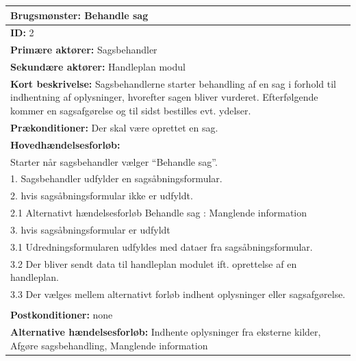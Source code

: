 \begin{center} \label{tab:2}
\begin{longtable}{|p{18cm}|}
\hline
\textbf{Brugsmønster:} Behandle sag \\
\hline
\textbf{ID:} 2\\
\hline
\textbf{Primære aktører:} Sagsbehandler\\
\hline
\textbf{Sekundære aktører:} Handleplan modul\\
\hline
\textbf{Kort beskrivelse:}  Sagsbehandlerne starter behandling af en sag i forhold til indhentning af oplysninger, hvorefter sagen bliver vurderet. Efterfølgende kommer en sagsafgørelse og til sidst bestilles evt. ydelser. \\
\hline
\textbf{Prækonditioner:} Der skal være oprettet en sag. \\
\hline
\textbf{Hovedhændelsesforløb:}\\
Starter når sagsbehandler vælger “Behandle sag”.\\
1. Sagsbehandler udfylder en sagsåbningsformular.\\
2. hvis sagsåbningsformular ikke er udfyldt.\\
2.1 Alternativt hændelsesforløb Behandle sag : Manglende information\\
3. hvis sagsåbningsformular er udfyldt\\
3.1 Udredningsformularen udfyldes med dataer fra  sagsåbningsformular.\\
3.2 Der bliver sendt data til handleplan modulet ift. oprettelse af en handleplan. \\
3.3 Der vælges mellem alternativt forløb indhent oplysninger eller sagsafgørelse.\\
\\
\hline
\textbf{Postkonditioner: }none\\
\hline
\textbf{Alternative hændelsesforløb: }Indhente oplysninger fra eksterne kilder, Afgøre sagsbehandling, Manglende information\\
\hline
\end{longtable}
\end{center}

